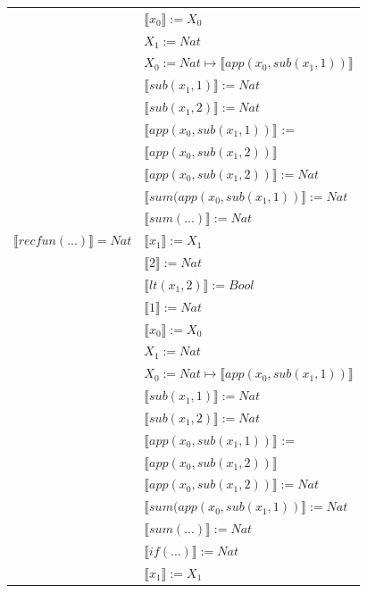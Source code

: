 \begin{exercise}
\begin{description}
\begin{center}
\begin{longtable}{ | l | l | }
			     & $ \llbracket x_0 \rrbracket := X_0$\\
			     & $X_1 := Nat$\\
			     & $X_0 := Nat \mapsto  \llbracket app(x_0, sub(x_1,1)) \rrbracket$\\
			     & $ \llbracket sub(x_1,1) \rrbracket := Nat$\\
			     & $ \llbracket sub(x_1,2) \rrbracket := Nat$ \\
			     & $ \llbracket app(x_0, sub(x_1,1)) \rrbracket$ := \\
			     & $ \llbracket app(x_0, sub(x_1,2)) \rrbracket$\\ 
			     & $ \llbracket app(x_0, sub(x_1,2)) \rrbracket := Nat$ \\
			     & $ \llbracket sum(app(x_0, sub(x_1,1)) \rrbracket := Nat$ \\
			     & $ \llbracket sum(...) \rrbracket := Nat$ \\
                     \hline 
                        $ \llbracket recfun(...) \rrbracket = Nat$ & $ \llbracket x_1 \rrbracket := X_1$\\
                        & $ \llbracket 2 \rrbracket := Nat$\\ 
                        & $ \llbracket lt(x_1 , 2) \rrbracket := Bool$\\  
			     & $ \llbracket 1 \rrbracket := Nat$\\
			     & $ \llbracket x_0 \rrbracket := X_0$\\
			     & $X_1 := Nat$\\
			     & $X_0 := Nat \mapsto  \llbracket app(x_0, sub(x_1,1)) \rrbracket$\\
			     & $ \llbracket sub(x_1,1) \rrbracket := Nat$\\
			     & $ \llbracket sub(x_1,2) \rrbracket := Nat$ \\
			     & $ \llbracket app(x_0, sub(x_1,1)) \rrbracket$ := \\
			     & $ \llbracket app(x_0, sub(x_1,2)) \rrbracket$\\ 
			     & $ \llbracket app(x_0, sub(x_1,2)) \rrbracket := Nat$ \\
			     & $ \llbracket sum(app(x_0, sub(x_1,1)) \rrbracket := Nat$ \\
			     & $ \llbracket sum(...) \rrbracket := Nat$ \\
			     & $ \llbracket if(...) \rrbracket := Nat$  \\
                     \hline 
			     & $ \llbracket x_1 \rrbracket := X_1$\\

\end{longtable}
\end{center}
\end{description}
\end{exercise}
